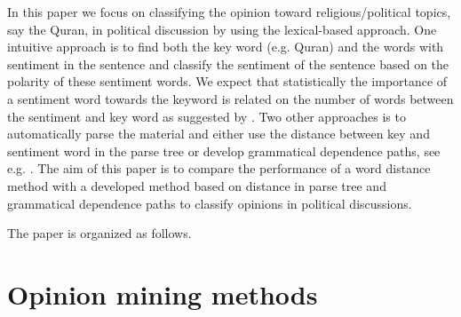 \documentclass[a4paper, 12pt]{article}
\begin{document}
In this paper we focus on classifying the opinion toward religious/political topics, say the Quran, in political discussion by using the lexical-based approach. 
One intuitive approach is to find both the key word (e.g. Quran) and the words with sentiment in the sentence and classify the sentiment of the sentence based on the polarity of these sentiment words. We expect that statistically the importance of a sentiment word towards the keyword is related on the number of words between the sentiment and key word as suggested by \citet{Ding08}. Two other approaches is to automatically parse the material and either use the distance between key and sentiment word in the parse tree or develop grammatical dependence paths, see e.g. \citet{Jiang11}. The aim of this paper is to compare the performance of a word distance method \citep{Ding08} with a developed method based on distance in parse tree and grammatical dependence paths to classify opinions in political discussions.

The paper is organized as follows. 

\section{Opinion mining methods}
\label{sec:om}
\end{document}
